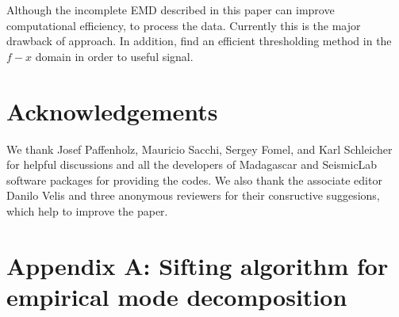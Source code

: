 Although the incomplete EMD described in this paper can improve computational efficiency,  to process the data. Currently\wen{,} this  is the major drawback of  approach. In addition,  find an efficient thresholding method in the $f-x$ domain in order to  useful signal.







\section{Acknowledgements}
We thank Josef Paffenholz, Mauricio Sacchi, Sergey Fomel, and Karl Schleicher for helpful discussions and all the developers of Madagascar and SeismicLab software packages for providing the codes. We also thank the associate editor Danilo Velis and three anonymous reviewers for their consructive suggesions, which help to improve the paper. 





\appendix
\section{Appendix A: Sifting algorithm for empirical mode decomposition}

